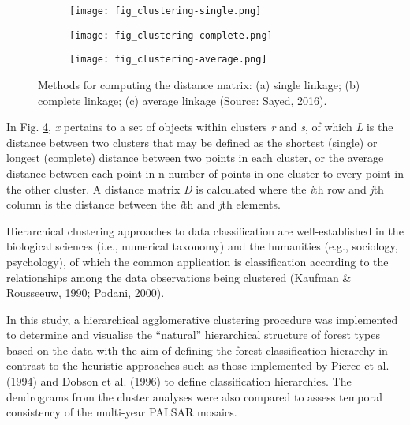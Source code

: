 \begin{figure}[!ht] \centering
	\captionsetup[subfigure]{width=2.0in} %
	\begin{subfigure}[t]{0.32\textwidth}
		\texttt{[image: fig\_clustering-single.png]}
		\caption[Linkage methods in clustering.]{}
		\label{fig: litrev-fig2.3a}
	\end{subfigure}
	\begin{subfigure}[t]{0.32\textwidth}
		\texttt{[image: fig\_clustering-complete.png]}
		\caption[Linkage methods in clustering.]{}
		\label{fig: litrev-fig2.3b}
	\end{subfigure}
	\begin{subfigure}[t]{0.32\textwidth}
		\texttt{[image: fig\_clustering-average.png]}
		\caption[Linkage methods in clustering.]{}
		\label{fig: litrev-fig2.3c}
	\end{subfigure}
	\caption[Methods for computing the distance matrix: (a) single linkage; (b) complete linkage; (c) average linkage.]{Methods for computing the distance matrix: (a) single linkage; (b) complete linkage; (c) average linkage (Source: Sayed, 2016).}
	\label{fig: litrev-fig2.3}
\end{figure}

In Fig. \ref{fig: litrev-fig2.3}, \textit{x} pertains to a set of objects within clusters \textit{r} and \textit{s}, of which \textit{L} is the distance between two clusters that may be defined as the shortest (single) or longest (complete) distance between two points in each cluster, or the average distance between each point in n number of points in one cluster to every point in the other cluster. A distance matrix \textit{D} is calculated where the \textit{i}th row and \textit{j}th column is the distance between the \textit{i}th and \textit{j}th elements.

Hierarchical clustering approaches to data classification are well-established in the biological sciences (i.e., numerical taxonomy) and the humanities (e.g., sociology, psychology), of which the common application is classification according to the relationships among the data observations being clustered (Kaufman \& Rousseeuw, 1990; Podani, 2000).

In this study, a hierarchical agglomerative clustering procedure was implemented to determine and visualise the \enquote{natural} hierarchical structure of forest types based on the data with the aim of defining the forest classification hierarchy in contrast to the heuristic approaches such as those implemented by Pierce et al. (1994) and Dobson et al. (1996) to define classification hierarchies. The dendrograms from the cluster analyses were also compared to assess temporal consistency of the multi-year PALSAR mosaics.

